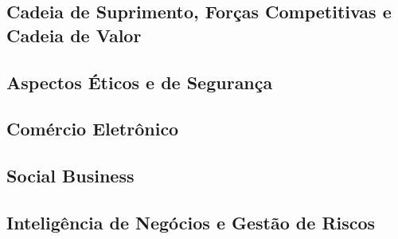 \subsection{Cadeia de Suprimento, Forças Competitivas e Cadeia de Valor}

\subsection{Aspectos Éticos e de Segurança}

\subsection{Comércio Eletrônico}

\subsection{Social Business}

\subsection{Inteligência de Negócios e Gestão de Riscos}